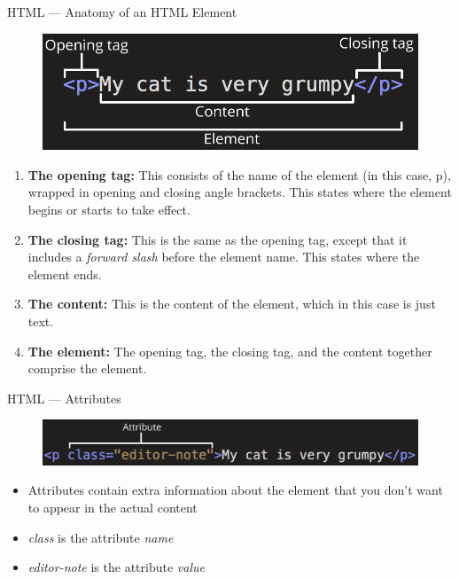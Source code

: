 \documentclass[aspectratio=169]{beamer}
\begin{document}
\begin{darkframes}
    \begin{frame}{HTML — Anatomy of an HTML Element}
        \begin{figure}[h]
            \centering
            \includegraphics[width=0.5\linewidth]{resources/grumpy-cat-small.png}
        \end{figure}
        \begin{enumerate}
            \item \textbf{The opening tag:} This consists of the name of the element (in this case, p), wrapped in opening and closing angle brackets. This states where the element begins or starts to take effect.
            \item \textbf{The closing tag:} This is the same as the opening tag, except that it includes a \textit{forward slash} before the element name. This states where the element ends.
            \item \textbf{The content:} This is the content of the element, which in this case is just text.
            \item \textbf{The element:} The opening tag, the closing tag, and the content together comprise the element.
        \end{enumerate}
    \end{frame}
    
    \begin{frame}{HTML — Attributes}
        \begin{figure}[h]
            \centering
            \includegraphics[width=0.7\linewidth]{resources/grumpy-cat-attribute-small.png}
        \end{figure}
        \begin{itemize}
            \item Attributes contain extra information about the element that you don't want to appear in the actual content
            \item \textit{class} is the attribute \textit{name}
            \item \textit{editor-note} is the attribute \textit{value}
        \end{itemize}
    \end{frame}
    

\end{darkframes}
\end{document}
